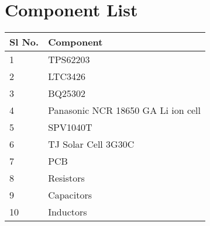 \chapter{Component List}
\begin{table}[h]
	\begin{center}
	\begin{tabular}{|l|l|}
		\hline
		{\bf Sl No.} & {\bf Component} \\ \hline
		1 & TPS62203 \\ \hline
		2 & LTC3426 \\ \hline
		3 & BQ25302 \\ \hline
		4 & Panasonic NCR 18650 GA Li ion cell \\ \hline
		5 & SPV1040T \\ \hline
		6 & TJ Solar Cell 3G30C \\ \hline
		7 & PCB \\ \hline
		8 & Resistors \\ \hline
		9 & Capacitors \\ \hline
		10 & Inductors \\ \hline
	\end{tabular}
	\end{center}
\end{table}